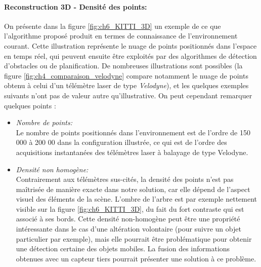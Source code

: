 \paragraph{Reconstruction 3D - Densité des points:\\}
On présente dans la figure \ref{fig:ch6_KITTI_3D} un exemple de ce que l'algorithme proposé produit en termes de connaissance de l'environnement courant. Cette illustration représente le nuage de points positionnés dans l'espace en temps réel, qui peuvent ensuite être exploités par des algorithmes de détection d'obstacles ou de planification. De nombreuses illustrations sont possibles (la figure \ref{fig:ch4_comparaison_velodyne} compare notamment le nuage de points obtenu à celui d'un télémètre laser de type \textit{Velodyne}), et les quelques exemples suivants n'ont pas de valeur autre qu'illustrative. On peut cependant remarquer quelques points :
\begin{itemize}
	\item {\emph{Nombre de points:\\}}
	Le nombre de points positionnés dans l'environnement est de l'ordre de 150 000 à 200 00 dans la configuration illustrée, ce qui est de l'ordre des acquisitions instantanées des télémètres laser à balayage de type \og Velodyne\fg{}.\\
	
	\item {\emph{Densité non homogène:\\}}
	Contrairement aux télémètres sus-cités, la densité des points n'est pas maîtrisée de manière exacte dans notre solution, car elle dépend de l'aspect visuel des éléments de la scène. L'ombre de l'arbre est par exemple nettement visible sur la figure \ref{fig:ch6_KITTI_3D}, du fait du fort contraste qui est associé à ses bords. Cette densité non-homogène peut être une propriété intéressante dans le cas d'une altération volontaire (pour suivre un objet particulier par exemple), mais elle pourrait être problématique pour obtenir une détection certaine des objets mobiles. La fusion des informations obtenues avec un capteur tiers pourrait présenter une solution à ce problème.
\end{itemize}

